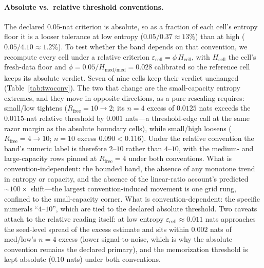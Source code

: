 \documentclass[11pt]{article}
\begin{document}
\paragraph{Absolute vs.\ relative threshold conventions.}\label{par:twoconv}
The declared $0.05$-nat criterion is absolute, so as a fraction of each cell's
entropy floor it is a looser tolerance at low entropy ($0.05/0.37 \approx 13\%$)
than at high ($0.05/4.10 \approx 1.2\%$). To test whether the band depends on that
convention, we recompute every cell under a relative criterion
$\varepsilon_{\mathrm{cell}} = \phi\, H_{\mathrm{cell}}$, with $H_{\mathrm{cell}}$
the cell's fresh-data floor and $\phi = 0.05/H_{\mathrm{med/med}} = 0.028$
calibrated so the reference cell keeps its absolute verdict. Seven of nine cells
keep their verdict unchanged (Table~\ref{tab:twoconv}). The two that change are the
small-capacity entropy extremes, and they move in opposite directions, as a pure
rescaling requires: small/low tightens ($R_{\mathrm{free}} = 10 \to 2$; its $n{=}4$
excess of $0.0125$ nats exceeds the $0.0115$-nat relative threshold by $0.001$
nats---a threshold-edge call at the same razor margin as the absolute boundary
cells), while small/high loosens ($R_{\mathrm{free}} = 4 \to 10$; $n{=}10$ excess
$0.090 < 0.116$). Under the relative convention the band's numeric label is
therefore $2$--$10$ rather than $4$--$10$, with the medium- and large-capacity rows
pinned at $R_{\mathrm{free}} = 4$ under both conventions. What is
convention-independent: the bounded band, the absence of any monotone trend in
entropy or capacity, and the absence of the linear-ratio account's predicted
${\sim}100\times$ shift---the largest convention-induced movement is one grid rung,
confined to the small-capacity corner. What is convention-dependent: the specific
numerals ``$4$--$10$'', which are tied to the declared absolute threshold. Two
caveats attach to the relative reading itself: at low entropy
$\varepsilon_{\mathrm{cell}} \approx 0.011$ nats approaches the seed-level spread
of the excess estimate and sits within $0.002$ nats of med/low's $n{=}4$ excess
(lower signal-to-noise, which is why the absolute
convention remains the declared primary), and the memorization threshold is kept
absolute ($0.10$ nats) under both conventions.
\end{document}
